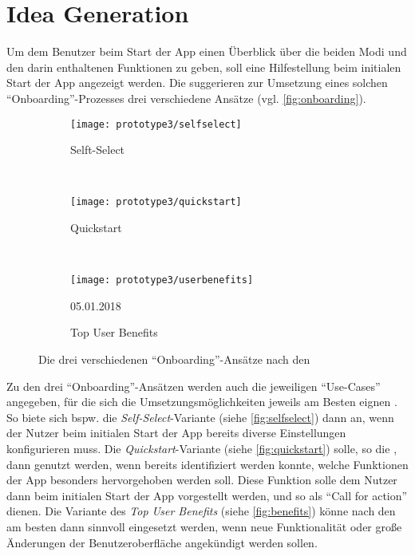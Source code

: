 \section{Idea Generation}\label{sec:idea3}
Um dem Benutzer beim Start der App einen Überblick über die beiden Modi und den darin enthaltenen Funktionen zu geben, soll eine Hilfestellung beim initialen Start der App angezeigt werden.
Die \mg{} suggerieren zur Umsetzung eines solchen ``Onboarding''-Prozesses drei verschiedene Ansätze (vgl. \autoref{fig:onboarding}). \\

\begin{figure}[h]
  \begin{subfigure}[t]{0.3\textwidth}
    \centering
    \texttt{[image: prototype3/selfselect]}
    \caption{Selft-Select}
    \label{fig:selfselect}
  \end{subfigure}
  ~
  \begin{subfigure}[t]{0.3\textwidth}
    \centering
    \texttt{[image: prototype3/quickstart]}
    \caption{Quickstart}
    \label{fig:quickstart}
  \end{subfigure}
  ~
  \begin{subfigure}[t]{0.3\textwidth}
    \centering
    \texttt{[image: prototype3/userbenefits]}
    \caption{Top User Benefits}{05.01.2018}
    \label{fig:benefits}
  \end{subfigure}
  \centering
  \caption{Die drei verschiedenen ``Onboarding''-Ansätze nach den \mg{}}
  \label{fig:onboarding}
\end{figure}

Zu den drei ``Onboarding''-Ansätzen werden auch die jeweiligen ``Use-Cases'' angegeben, für die sich die Umsetzungsmöglichkeiten jeweils am Besten eignen \citep[Abschnitt ``Usage'']{Onboarding}.
So biete sich bspw. die \emph{Self-Select}-Variante (siehe \autoref{fig:selfselect}) dann an, wenn der Nutzer beim initialen Start der App bereits diverse Einstellungen konfigurieren muss.
Die \emph{Quickstart}-Variante (siehe \autoref{fig:quickstart}) solle, so die \mg{}, dann genutzt werden, wenn bereits identifiziert werden konnte, welche Funktionen der App besonders hervorgehoben werden soll.
Diese Funktion solle dem Nutzer dann beim initialen Start der App vorgestellt werden, und so als ``Call for action'' dienen.
Die Variante des \emph{Top User Benefits} (siehe \autoref{fig:benefits}) könne nach den \mg{} am besten dann sinnvoll eingesetzt werden, wenn neue Funktionalität oder große Änderungen der Benutzeroberfläche angekündigt werden sollen. \\

